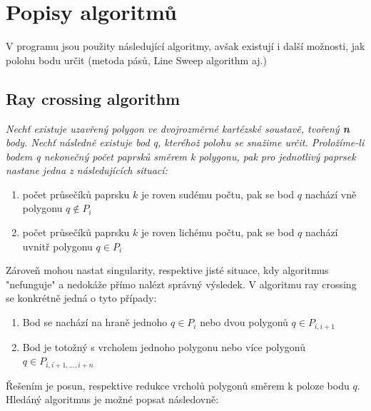 \documentclass{article}
\begin{document}
\section{Popisy algoritmů} %
V programu jsou použity následující algoritmy, avšak existují i další možnosti, jak polohu bodu určit (metoda pásů, Line Sweep algorithm aj.)
\subsection{Ray crossing algorithm}
\textsl{Nechť existuje uzavřený polygon ve dvojrozměrné kartézské soustavě, tvořený \textbf n body. Nechť následně existuje bod q, kteréhož polohu se snažime určit. Proložíme-li bodem q nekonečný počet paprsků směrem k polygonu, pak pro jednotlivý paprsek nastane jedna z následujících situací: }
\begin{enumerate}
\item   počet průsečíků paprsku  $k$ je roven sudému počtu, pak se bod $q$ nachází vně polygonu  $q {\not \in} P_i$ 
\item  počet průsečíků paprsku  $k$ je roven lichému počtu, pak se bod $q$ nachází uvnitř polygonu  $q \in P_i$
\end{enumerate} 
Zároveň mohou nastat singularity, respektive jisté situace, kdy algoritmus "nefunguje" a nedokáže přímo nalézt správný výsledek. V algoritmu ray crossing se konkrétně jedná o tyto případy:
\begin{enumerate}
\item   Bod se nachází na hraně jednoho  $q {\in} P_i$ nebo dvou polygonů $q {\in} P_{i,i+1}$ 
\item   Bod je totožný s vrcholem jednoho polygonu nebo více polygonů $q {\in} P_{i,i+1,...,i+n}$
\end{enumerate} 
Řešením je posun, respektive redukce vrcholů polygonů směrem k poloze bodu  $q$.
\\
Hledáný algoritmus je možné popsat následovně:
\end{document}
